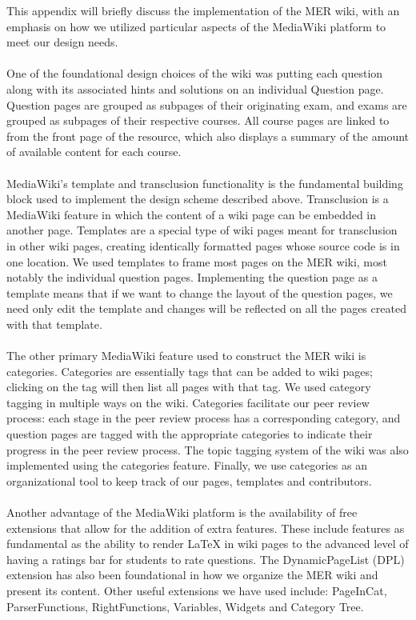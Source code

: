 \documentclass{primus}
\begin{document}
This appendix will briefly discuss the implementation of the MER wiki, with an emphasis on how we utilized particular aspects of the MediaWiki platform to meet our design needs.
\\\\  
\noindent{}One of the foundational design choices of the wiki was putting each question along with its associated hints and solutions on an individual Question page.  Question pages are grouped as subpages of their originating exam, and exams are grouped as subpages of their respective courses.  All course pages are linked to from the front page of the resource, which also displays a summary of the amount of available content for each course.
\\\\
\noindent{}MediaWiki’s template and transclusion functionality is the fundamental building block used to implement the design scheme described above.  Transclusion is a MediaWiki feature in which the content of a wiki page can be embedded in another page.  Templates are a special type of wiki pages meant for transclusion in other wiki pages, creating identically formatted pages whose source code is in one location.  We used templates to frame most pages on the MER wiki, most notably the individual question pages.  Implementing the question page as a template means that if we want to change the layout of the question pages, we need only edit the template and changes will be reflected on all the pages created with that template.
\\\\
\noindent{}The other primary MediaWiki feature used to construct the MER wiki is categories.  Categories are essentially tags that can be added to wiki pages; clicking on the tag will then list all pages with that tag.  We used category tagging in multiple ways on the wiki.  Categories facilitate our peer review process: each stage in the peer review process has a corresponding category, and  question pages are tagged with the appropriate categories to indicate their progress in the peer review process.  The topic tagging system of the wiki was also implemented using the categories feature.   Finally, we use categories as an organizational tool to keep track of our pages, templates and contributors.
\\\\  
\noindent{}Another advantage of the MediaWiki platform is the availability of free extensions that allow for the addition of extra features.  These include features as fundamental as the ability to render LaTeX in wiki pages to the advanced level of having a ratings bar for students to rate questions.  The DynamicPageList (DPL) extension has also been foundational in how we organize the MER wiki and present its content.  Other useful extensions we have used include: PageInCat, ParserFunctions, RightFunctions, Variables, Widgets and Category Tree.
\end{document}
